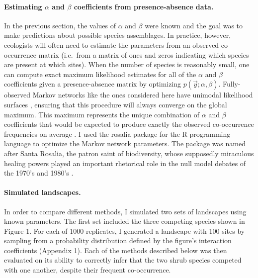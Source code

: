 \paragraph{\texorpdfstring{Estimating \(\alpha\) and \(\beta\)
coefficients from presence-absence
data.}{Estimating \textbackslash{}alpha and \textbackslash{}beta coefficients from presence-absence data.}}\label{estimating-alpha-and-beta-coefficients-from-presence-absence-data.}

In the previous section, the values of \(\alpha\) and \(\beta\) were
known and the goal was to make predictions about possible species
assemblages. In practice, however, ecologists will often need to
estimate the parameters from an observed co-occurrence matrix (i.e.~from
a matrix of ones and zeros indicating which species are present at which
sites). When the number of species is reasonably small, one can compute
exact maximum likelihood estimates for all of the \(\alpha\) and
\(\beta\) coefficients given a presence-absence matrix by optimizing
\(p(\vec{y}; \alpha, \beta)\). Fully-observed Markov networks like the
ones considered here have unimodal likelihood surfaces
\citep{murphy_machine_2012}, ensuring that this procedure will always
converge on the global maximum. This maximum represents the unique
combination of \(\alpha\) and \(\beta\) coefficients that would be
expected to produce exactly the observed co-occurrence frequencies on
average \citep[i.e.~maximizing the likelihood matches the sufficient
statistics of the model distribution to the sufficient statistics of the
data;][]{murphy_machine_2012}. I used the rosalia package
\citep{harris_rosalia_2015} for the R programming language
\citep{r_core_team_r_2015} to optimize the Markov network parameters.
The package was named after Santa Rosalia, the patron saint of
biodiversity, whose supposedly miraculous healing powers played an
important rhetorical role in the null model debates of the 1970's and
1980's \citep{lewin_santa_1983}.

\paragraph{Simulated landscapes.}\label{simulated-landscapes.}

In order to compare different methods, I simulated two sets of
landscapes using known parameters. The first set included the three
competing species shown in Figure 1. For each of 1000 replicates, I
generated a landscape with 100 sites by sampling from a probability
distribution defined by the figure's interaction coefficients (Appendix
1). Each of the methods described below was then evaluated on its
ability to correctly infer that the two shrub species competed with one
another, despite their frequent co-occurrence.


